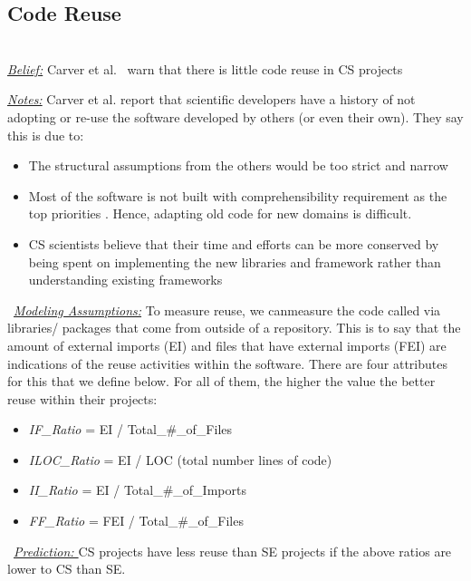 \documentclass[sigconf,review,anonymous]{acmart}
\newcommand{\bi}{\begin{itemize}}
\newcommand{\ei}{\end{itemize}}
\begin{document}
\subsection{Code Reuse} ~\\
\noindent \textit{\underline{Belief:}} 
Carver et al.~\cite{segal07_problem, carver06_hpc, Shull05_parallel, sanders08_risk} warn that there is little
code reuse in CS projects

\noindent \textit{\underline{Notes:}} 
Carver et al. report that scientific developers have a history of not adopting or re-use the software developed by others (or even their own). They 
say this is due to:

\bi
\item The structural assumptions from the others would be too strict and narrow \cite{carver06_hpc, basili08_hpc}
\item Most of the software is not built with comprehensibility requirement as the top priorities \cite{segal07_problem}. Hence, adapting old code for new domains is difficult.
\item
CS scientists believe that their time and efforts can be more conserved by being spent on implementing the new libraries and framework rather than understanding existing frameworks
\ei
\noindent ~\textit{\underline{Modeling Assumptions:}} To
measure reuse, we canmeasure the  code called
via libraries/ packages that come from outside of a repository. This is to say that the amount of external imports (EI) and files that have external imports (FEI) are indications of the reuse activities within the software. There are four attributes for this that we define below. For all of them, the higher the value the better reuse within their projects: 

\bi
\item \textit{IF\_Ratio} = EI / Total\_\#\_of\_Files
\item \textit{ILOC\_Ratio} = EI / LOC (total number lines of code)
\item \textit{II\_Ratio} = EI / Total\_\#\_of\_Imports 
\item \textit{FF\_Ratio} = FEI / Total\_\#\_of\_Files
\ei


\noindent~\textit{\underline{Prediction: }}CS projects have
less reuse than SE projects if the above ratios
are lower to CS than SE. 
\end{document}
